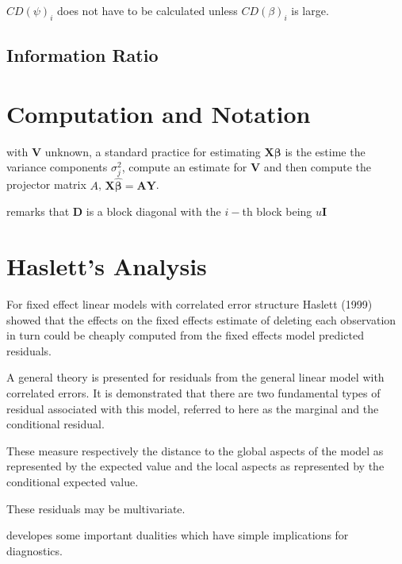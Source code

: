 \documentclass[12pt, a4paper]{article}
\begin{document}
$CD(\psi)_i$ does not have to be calculated unless $CD(\beta)_i$ is large.




\subsection{Information Ratio}




\newpage

\section{Computation and Notation } %
with $\boldsymbol{V}$ unknown, a standard practice for estimating $\boldsymbol{X \beta}$ is the estime the variance components $\sigma^2_j$,
compute an estimate for $\boldsymbol{V}$ and then compute the projector matrix $A$, $\boldsymbol{X \hat{\beta}}  = \boldsymbol{AY}$.


\citet{zewotir} remarks that $\boldsymbol{D}$ is a block diagonal with the $i-$th block being $u \boldsymbol{I}$




\section{Haslett's Analysis} %
For fixed effect linear models with correlated error structure Haslett (1999) showed that the effects on
the fixed effects estimate of deleting each observation in turn could be cheaply computed from the fixed effects model predicted residuals.



A general theory is presented for residuals from the general linear model with correlated errors.
It is demonstrated that there are two fundamental types of residual associated with this model,
referred to here as the marginal and the conditional residual.


These measure respectively the distance to the global aspects of the model as represented by the expected value
and the local aspects as represented by the conditional expected value.


These residuals may be multivariate.


\citet{HaslettHayes} developes some important dualities which have simple implications for diagnostics.
\end{document}
